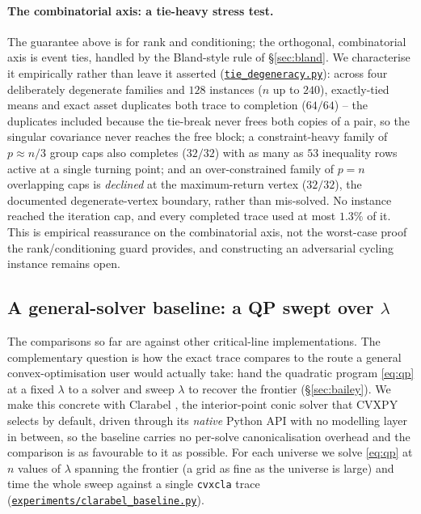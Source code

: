 \documentclass[11pt]{article}
\newcommand{\repourl}{https://github.com/cvxgrp/cvxcla}
\newcommand{\srcref}{v1.8.1}
\newcommand{\srcfile}[2]{\href{\repourl/blob/\srcref/#1}{\texttt{#2}}}
\begin{document}
\paragraph{The combinatorial axis: a tie-heavy stress test.}
The guarantee above is for rank and conditioning; the orthogonal, combinatorial axis
is event ties, handled by the Bland-style rule of \S\ref{sec:bland}. We characterise
it empirically rather than leave it asserted
(\srcfile{experiments/tie_degeneracy.py}{tie\_degeneracy.py}): across four
deliberately degenerate families and $128$ instances ($n$ up to $240$), exactly-tied
means and exact asset duplicates both trace to completion ($64/64$) -- the duplicates
included because the tie-break never frees both copies of a pair, so the singular
covariance never reaches the free block; a constraint-heavy family of $p\approx n/3$
group caps also completes ($32/32$) with as many as $53$ inequality rows active at a
single turning point; and an over-constrained family of $p=n$ overlapping caps is
\emph{declined} at the maximum-return vertex ($32/32$), the documented
degenerate-vertex boundary, rather than mis-solved. No instance reached the iteration
cap, and every completed trace used at most $1.3\%$ of it. This is empirical
reassurance on the combinatorial axis, not the worst-case proof the rank/conditioning
guard provides, and constructing an adversarial cycling instance remains open.

\subsection{A general-solver baseline: a QP swept over \texorpdfstring{$\lambda$}{lambda}}
\label{sec:clarabel}

The comparisons so far are against other critical-line implementations. The
complementary question is how the exact trace compares to the route a general
convex-optimisation user would actually take: hand the quadratic program
\eqref{eq:qp} at a fixed $\lambda$ to a solver and sweep $\lambda$ to recover the
frontier (\S\ref{sec:bailey}). We make this concrete with Clarabel
\citep{clarabel}, the interior-point conic solver that CVXPY selects by default,
driven through its \emph{native} Python API with no modelling layer in between, so
the baseline carries no per-solve canonicalisation overhead and the comparison is
as favourable to it as possible. For each universe we solve \eqref{eq:qp} at $n$
values of $\lambda$ spanning the frontier (a grid as fine as the universe is large)
and time the whole sweep against a single \texttt{cvxcla} trace
(\srcfile{experiments/clarabel_baseline.py}{experiments/clarabel\_baseline.py}).
\end{document}
